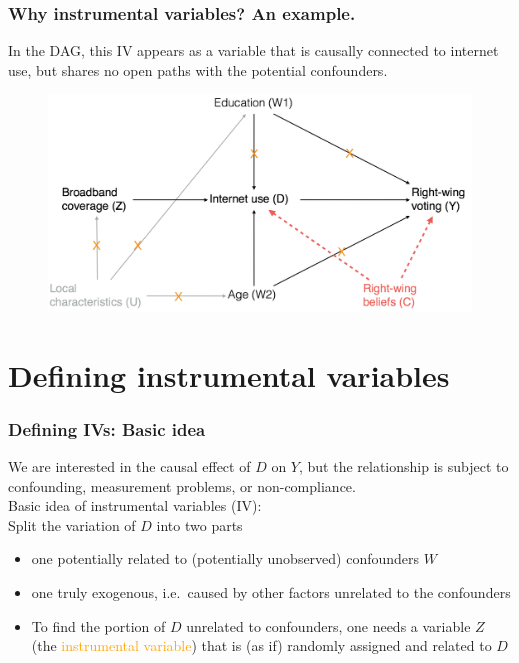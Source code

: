 \documentclass[12pt,english,dvipsnames,aspectratio=169,handout]{beamer}\usepackage[]{graphicx}\usepackage[]{xcolor}
\begin{document}
\begin{frame}
  \frametitle{Why instrumental variables? An example.}
    In the DAG, this IV appears as a variable that is causally connected to internet use, but shares no open paths with the potential confounders.
	\begin{figure} 
    \includegraphics[height=.45\textheight,keepaspectratio=true]{../04-figures/05/05-w5_dag_5.png}
    \end{figure}
\vspace{3cm}
\end{frame}



\section{Defining instrumental variables}

\begin{frame}
  \frametitle{Defining IVs: Basic idea}
    We are interested in the causal effect of $D$ on $Y$, but the relationship is subject to confounding, measurement problems, or non-compliance. \\
    \vspace{3mm}
    Basic idea of instrumental variables (IV): \\ 
    Split the variation of $D$ into two parts
  \begin{itemize} \footnotesize
  	\item one potentially related to (potentially unobserved) confounders $W$
	  \item one truly exogenous, i.e.\ caused by other factors unrelated to the confounders
	  \item To find the portion of $D$ unrelated to confounders, one needs a variable $Z$ (the \textcolor{orange}{instrumental variable}) that is (as if) randomly assigned and related to $D$
  \end{itemize}
\end{frame}
\end{document}
